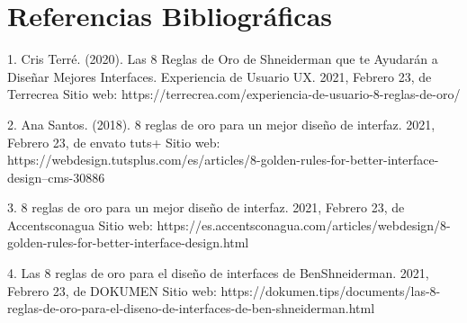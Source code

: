 \documentclass[14pt]{article}
\begin{document}
    \section*{\center Referencias Bibliográficas}
    \vspace*{1cm}
        1. Cris Terré. (2020). Las 8 Reglas de Oro de Shneiderman que te Ayudarán a Diseñar Mejores Interfaces. Experiencia de Usuario UX. 2021, Febrero 23, de Terrecrea Sitio web: https://terrecrea.com/experiencia-de-usuario-8-reglas-de-oro/

        \vspace{10}
        2. Ana Santos. (2018). 8 reglas de oro para un mejor diseño de interfaz. 2021, Febrero 23, de envato tuts+ Sitio web: https://webdesign.tutsplus.com/es/articles/8-golden-rules-for-better-interface-design--cms-30886

        \vspace{10}
        3. 8 reglas de oro para un mejor diseño de interfaz. 2021, Febrero 23, de Accentsconagua Sitio web: https://es.accentsconagua.com/articles/webdesign/8-golden-rules-for-better-interface-design.html

        \vspace{10}
        4. Las 8 reglas de oro para el diseño de interfaces de BenShneiderman. 2021, Febrero 23, de DOKUMEN Sitio web: https://dokumen.tips/documents/las-8-reglas-de-oro-para-el-diseno-de-interfaces-de-ben-shneiderman.html
\end{document}
